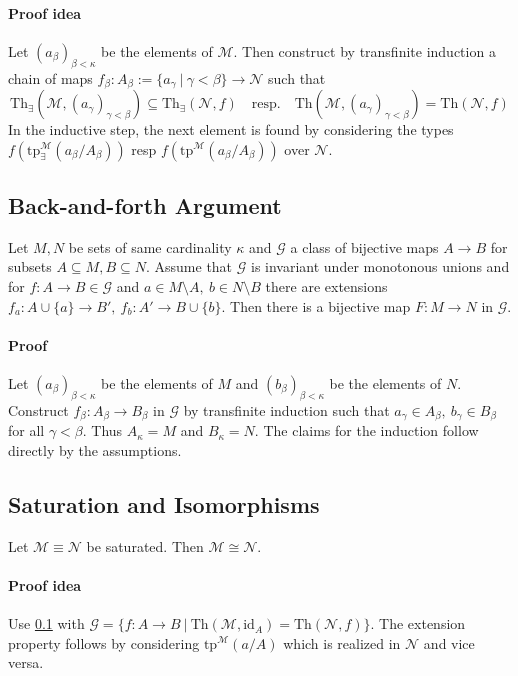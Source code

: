 \documentclass{scrartcl}
\begin{document}
\paragraph{Proof idea} Let $(a_\beta)_{\beta < \kappa}$ be the elements of $\mathcal{M}$. 
Then construct by transfinite induction a chain of maps $f_\beta: A_\beta := \{a_\gamma \ | \ \gamma < \beta\} \to \mathcal{N}$ such that
\begin{equation*}
    \mathrm{Th}_\exists(\mathcal{M}, (a_\gamma)_{\gamma < \beta}) \subseteq \mathrm{Th}_\exists(\mathcal{N}, f) \quad \text{resp.} \quad \mathrm{Th}(\mathcal{M}, (a_\gamma)_{\gamma < \beta}) = \mathrm{Th}(\mathcal{N}, f)
\end{equation*}
In the inductive step, the next element is found by considering the types $f(\mathrm{tp}_\exists^{\mathcal{M}}(a_\beta / A_\beta))$ resp $f(\mathrm{tp}^{\mathcal{M}}(a_\beta / A_\beta))$ over $\mathcal{N}$.

\subsection{Back-and-forth Argument}
\label{back_and_forth}
Let $M, N$ be sets of same cardinality $\kappa$ and $\mathcal{G}$ a class of bijective maps $A \to B$ for subsets $A \subseteq M, B \subseteq N$.
Assume that $\mathcal{G}$ is invariant under monotonous unions and for $f: A \to B \in \mathcal{G}$ and $a \in M \setminus A, \ b \in N \setminus B$ there are extensions $f_a: A \cup \{a\} \to B', \ f_b: A' \to B \cup \{b\}$.
Then there is a bijective map $F: M \to N$ in $\mathcal{G}$.

\paragraph{Proof} Let $(a_\beta)_{\beta < \kappa}$ be the elements of $M$ and $(b_\beta)_{\beta < \kappa}$ be the elements of $N$.
Construct $f_\beta: A_\beta \to B_\beta$ in $\mathcal{G}$ by transfinite induction such that $a_\gamma \in A_\beta, \ b_\gamma \in B_\beta$ for all $\gamma < \beta$.
Thus $A_\kappa = M$ and $B_\kappa = N$. The claims for the induction follow directly by the assumptions.

\subsection{Saturation and Isomorphisms}
Let $\mathcal{M} \equiv \mathcal{N}$ be saturated. Then $\mathcal{M} \cong \mathcal{N}$.
\paragraph{Proof idea} 
Use \ref{back_and_forth} with $\mathcal{G} = \{ f: A \to B \ | \ \mathrm{Th}(\mathcal{M}, \mathrm{id}_A) = \mathrm{Th}(\mathcal{N}, f)\}$.
The extension property follows by considering $\mathrm{tp}^{\mathcal{M}}(a/A)$ which is realized in $\mathcal{N}$ and vice versa.
\end{document}
